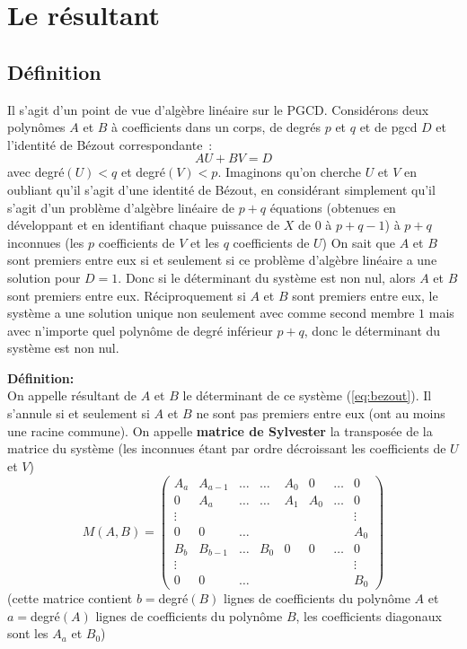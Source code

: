 \documentclass[a4paper,11pt]{article}
\begin{document}
\section{Le résultant} \label{sec:resultant} 
\subsection{D\'efinition}
Il s'agit d'un point de vue d'algèbre linéaire sur le PGCD. Considérons
deux polynômes $A$ et $B$ \`a coefficients dans un corps,
de degrés $p$ et $q$ et de pgcd $D$ et 
l'identité de Bézout correspondante~:
\begin{equation} \label{eq:bezout}
 A U + B V =D
\end{equation}
avec degré$(U)<q$ et degré$(V)<p$.
Imaginons qu'on cherche $U$ et $V$ en oubliant qu'il s'agit d'une
identité de Bézout, en considérant simplement qu'il s'agit d'un
problème d'algèbre linéaire de $p+q$ équations (obtenues en développant
et en identifiant chaque puissance de $X$ de 0 à $p+q-1$) 
à $p+q$ inconnues (les $p$ coefficients de $V$ et les $q$ coefficients de $U$)
On sait que $A$ et $B$ sont premiers entre eux si et seulement si ce problème
d'algèbre linéaire a une solution pour $D=1$. Donc si le déterminant
du système est non nul, alors $A$ et $B$ sont premiers entre eux.
Réciproquement si $A$ et $B$ sont premiers entre eux, le système a
une solution unique non seulement avec comme second membre $1$ mais avec
n'importe quel polynôme de degré inférieur $p+q$, donc le
déterminant du système est non nul.

{\bf Définition:} \\
On appelle résultant de $A$ et $B$ le déterminant de ce système 
(\ref{eq:bezout}). Il s'annule si et seulement si $A$ et $B$
ne sont pas premiers entre eux (ont au moins une racine commune).
On appelle {\bf matrice de Sylvester} la transposée de la matrice du système
(les inconnues étant par ordre décroissant les coefficients de $U$
et $V$)
\[ M(A,B)=\left( \begin{array}{cccccccc}
A_a   & A_{a-1} & \ldots & \ldots & A_0 & 0   & \ldots & 0 \\
0     & A_a     & \ldots & \ldots & A_1 & A_0 & \ldots & 0 \\
\vdots &        &        &      &     &  &      & \vdots \\
0     & 0       & \ldots &     &     &    &    & A_0 \\
B_b   & B_{b-1} & \ldots & B_0  & 0 &  0 & \ldots & 0 \\
\vdots &        &        &      &     &    &    & \vdots \\
0     &   0     & \ldots &    &      &     &   & B_0 
\end{array}
\right) \]
(cette matrice contient $b=$degré$(B)$ lignes de coefficients
du polynôme $A$ et $a=$degré$(A)$ lignes de coefficients du
polynôme $B$, les coefficients diagonaux sont les $A_a$ et $B_0$)
\end{document}
